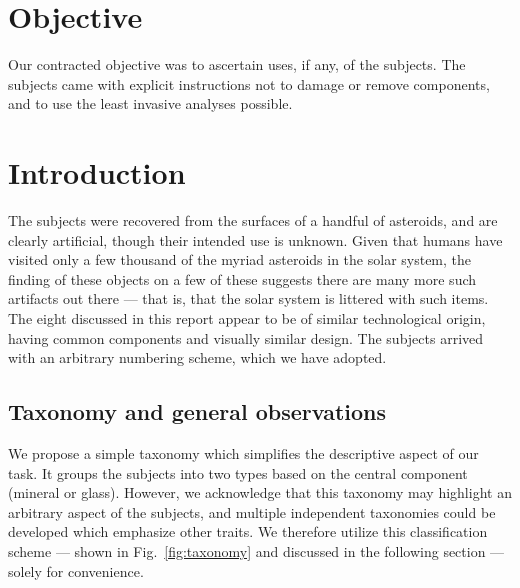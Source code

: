 \documentclass[10pt]{article}
\theoremstyle{definition}
\begin{document}
\maketitle


\section{Objective}
Our contracted objective was to ascertain uses, if any, of the subjects.
The subjects came with explicit instructions not to damage or remove components, and to use the least invasive analyses possible.

\section{Introduction}
The subjects were recovered from the surfaces of a handful of asteroids, and are clearly artificial, though their intended use is unknown.
Given that humans have visited only a few thousand of the myriad asteroids in the solar system, the finding of these objects on a few of these suggests there are many more such artifacts out there --- that is, that the solar system is littered with such items.
The eight discussed in this report appear to be of similar technological origin, having common components and visually similar design.
The subjects arrived with an arbitrary numbering scheme, which we have adopted.

\subsection{Taxonomy and general observations}\label{sec:taxonomy}
We propose a simple taxonomy which simplifies the descriptive aspect of our task.
It groups the subjects into two types based on the central component (mineral or glass).
However, we acknowledge that this taxonomy may highlight an arbitrary aspect of the subjects, and multiple independent taxonomies could be developed which emphasize other traits.
We therefore utilize this classification scheme --- shown in Fig.~\ref{fig:taxonomy} and discussed in the following section --- solely for convenience.
\end{document}
